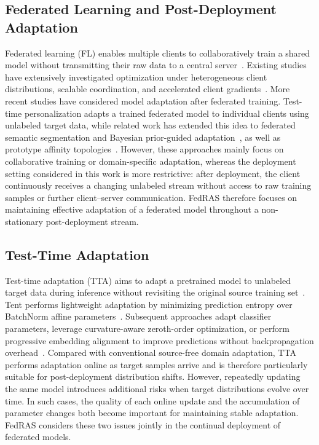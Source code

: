 \documentclass[journal]{IEEEtran}
\begin{document}
\subsection{Federated Learning and Post-Deployment Adaptation}
Federated learning (FL) enables multiple clients to collaboratively train a shared model without transmitting their raw data to a central server~\cite{1, 15}. Existing studies have extensively investigated optimization under heterogeneous client distributions, scalable coordination, and accelerated client gradients~\cite{16}. More recent studies have considered model adaptation after federated training. Test-time personalization adapts a trained federated model to individual clients using unlabeled target data, while related work has extended this idea to federated semantic segmentation and Bayesian prior-guided adaptation~\cite{17, 18, 19}, as well as prototype affinity topologies~\cite{20}. However, these approaches mainly focus on collaborative training or domain-specific adaptation, whereas the deployment setting considered in this work is more restrictive: after deployment, the client continuously receives a changing unlabeled stream without access to raw training samples or further client--server communication. FedRAS therefore focuses on maintaining effective adaptation of a federated model throughout a non-stationary post-deployment stream.

\subsection{Test-Time Adaptation}
Test-time adaptation (TTA) aims to adapt a pretrained model to unlabeled target data during inference without revisiting the original source training set~\cite{4, 25}. Tent performs lightweight adaptation by minimizing prediction entropy over BatchNorm affine parameters~\cite{4}. Subsequent approaches adapt classifier parameters, leverage curvature-aware zeroth-order optimization, or perform progressive embedding alignment to improve predictions without backpropagation overhead~\cite{21, 22, 23}. Compared with conventional source-free domain adaptation, TTA performs adaptation online as target samples arrive and is therefore particularly suitable for post-deployment distribution shifts. However, repeatedly updating the same model introduces additional risks when target distributions evolve over time. In such cases, the quality of each online update and the accumulation of parameter changes both become important for maintaining stable adaptation. FedRAS considers these two issues jointly in the continual deployment of federated models.
\end{document}
